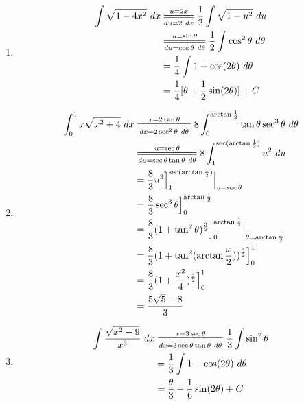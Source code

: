\documentclass{article}
\begin{document}
\begin{enumerate}[label={\bf{}\arabic*}.]
\item%
	\begin{align*}
	\int\sqrt{1-4x^2}\ dx&\overset{u=2x}{\underset{du=2\ dx}{=\joinrel=\joinrel=\joinrel=\joinrel=}}\frac{1}{2}\int\sqrt{1-u^2}\ du\\
	&\overset{u=\sin\theta}{\underset{du=\cos\theta\ d\theta}{=\joinrel=\joinrel=\joinrel=\joinrel=\joinrel=\joinrel=}}\frac{1}{2}\int\cos^2\theta\ d\theta\\
	&=\frac{1}{4}\int1+\cos(2\theta)\ d\theta\\
	&=\frac{1}{4}[\theta+\frac{1}{2}\sin(2\theta)]+C
	\end{align*}

\item%
	\begin{align*}
	\int_0^1x\sqrt{x^2+4}\ dx&\overset{x=2\tan\theta}{\underset{dx=2\sec^2\theta\ d\theta}{=\joinrel=\joinrel=\joinrel=\joinrel=\joinrel=\joinrel=\joinrel=\joinrel=}}8\int_0^{\arctan\frac{1}{2}}\tan\theta\sec^3\theta\ d\theta\\
	&\overset{u=\sec\theta}{\underset{du=\sec\theta\tan\theta\ d\theta}{=\joinrel=\joinrel=\joinrel=\joinrel=\joinrel=\joinrel=\joinrel=\joinrel=\joinrel=}}8\int_1^{\sec(\arctan\frac{1}{2})}u^2\ du\\
	&=\frac{8}{3}u^3\Big]_1^{\sec(\arctan\frac{1}{2})}\Big|_{u=\sec\theta}\\
	&=\frac{8}{3}\sec^3\theta\Big]_0^{\arctan\frac{1}{2}}\\
	&=\frac{8}{3}(1+\tan^2\theta)^\frac{3}{2}\Big]_0^{\arctan\frac{1}{2}}\Big|_{\theta=\arctan\frac{x}{2}}\\
	&=\frac{8}{3}(1+\tan^2(\arctan\frac{x}{2}))^\frac{3}{2}\Big]_0^1\\
	&=\frac{8}{3}(1+\frac{x^2}{4})^\frac{3}{2}\Big]_0^1\\
	&=\frac{5\sqrt{5}-8}{3}
	\end{align*}

\color{red}\item[\refstepcounter{enumi}\fbox{\number\value{enumi}.}]\color{black}%
	\begin{align*}
	\int\frac{\sqrt{x^2-9}}{x^3}\ dx&\overset{x=3\sec\theta}{\underset{dx=3\sec\theta\tan\theta\ d\theta}{=\joinrel=\joinrel=\joinrel=\joinrel=\joinrel=\joinrel=\joinrel=\joinrel=\joinrel=\joinrel=}}\frac{1}{3}\int\sin^2\theta\\
	&=\frac{1}{3}\int1-\cos(2\theta)\ d\theta\\
	&=\frac{\theta}{3}-\frac{1}{6}\sin(2\theta)+C
	\end{align*}


\end{enumerate}
\end{document}
